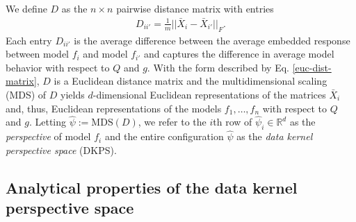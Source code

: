 We define $ D $ as the $ n \times n $ pairwise distance matrix with entries 
\begin{align}
\label{euc-dist-matrix}
    D_{ii'} = \frac{1}{m} \big|\big| \bar{X}_{i} - \bar{X}_{i'} \big|\big|_{F}.
\end{align} Each entry $ D_{ii'} $ is the average difference between the average embedded response between model $ f_{i} $ and model $ f_{i'} $ and captures the difference in average model behavior with respect to $ Q $ and $ g $. 
With the form described by Eq. \eqref{euc-dist-matrix}, $ D $ is a Euclidean distance matrix and the multidimensional scaling (MDS) of $ D $ yields $ d$-dimensional Euclidean representations of the matrices $ \bar{X}_{i} $ \citep{torgerson1952multidimensional} and, thus, Euclidean representations of the models $ f_{1}, \hdots, f_{n} $ with respect to $ Q $ and $ g $.
Letting $ \widehat{\psi} := \text{MDS}(D) $, we refer to the $ i $th row of $ \widehat{\psi}_{i} \in \mathbb{R}^{d} $ as the \textit{perspective} of model $ f_{i} $ and the entire configuration $ \widehat{\psi} $ as the \textit{data kernel perspective space} (DKPS).







\subsection{Analytical properties of the data kernel perspective space}


